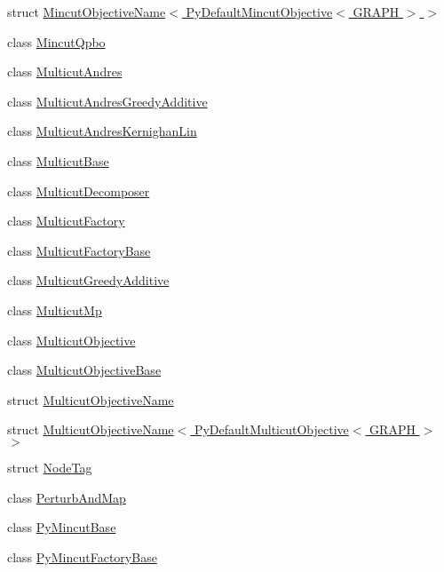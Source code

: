 \begin{DoxyCompactItemize}
struct \hyperlink{structnifty_1_1graph_1_1MincutObjectiveName_3_01PyDefaultMincutObjective_3_01GRAPH_01_4_01_4}{Mincut\+Objective\+Name$<$ Py\+Default\+Mincut\+Objective$<$ G\+R\+A\+P\+H $>$ $>$}
\item 
class \hyperlink{classnifty_1_1graph_1_1MincutQpbo}{Mincut\+Qpbo}
\item 
class \hyperlink{classnifty_1_1graph_1_1MulticutAndres}{Multicut\+Andres}
\item 
class \hyperlink{classnifty_1_1graph_1_1MulticutAndresGreedyAdditive}{Multicut\+Andres\+Greedy\+Additive}
\item 
class \hyperlink{classnifty_1_1graph_1_1MulticutAndresKernighanLin}{Multicut\+Andres\+Kernighan\+Lin}
\item 
class \hyperlink{classnifty_1_1graph_1_1MulticutBase}{Multicut\+Base}
\item 
class \hyperlink{classnifty_1_1graph_1_1MulticutDecomposer}{Multicut\+Decomposer}
\item 
class \hyperlink{classnifty_1_1graph_1_1MulticutFactory}{Multicut\+Factory}
\item 
class \hyperlink{classnifty_1_1graph_1_1MulticutFactoryBase}{Multicut\+Factory\+Base}
\item 
class \hyperlink{classnifty_1_1graph_1_1MulticutGreedyAdditive}{Multicut\+Greedy\+Additive}
\item 
class \hyperlink{classnifty_1_1graph_1_1MulticutMp}{Multicut\+Mp}
\item 
class \hyperlink{classnifty_1_1graph_1_1MulticutObjective}{Multicut\+Objective}
\item 
class \hyperlink{classnifty_1_1graph_1_1MulticutObjectiveBase}{Multicut\+Objective\+Base}
\item 
struct \hyperlink{structnifty_1_1graph_1_1MulticutObjectiveName}{Multicut\+Objective\+Name}
\item 
struct \hyperlink{structnifty_1_1graph_1_1MulticutObjectiveName_3_01PyDefaultMulticutObjective_3_01GRAPH_01_4_01_4}{Multicut\+Objective\+Name$<$ Py\+Default\+Multicut\+Objective$<$ G\+R\+A\+P\+H $>$ $>$}
\item 
struct \hyperlink{structnifty_1_1graph_1_1NodeTag}{Node\+Tag}
\item 
class \hyperlink{classnifty_1_1graph_1_1PerturbAndMap}{Perturb\+And\+Map}
\item 
class \hyperlink{classnifty_1_1graph_1_1PyMincutBase}{Py\+Mincut\+Base}
\item 
class \hyperlink{classnifty_1_1graph_1_1PyMincutFactoryBase}{Py\+Mincut\+Factory\+Base}

\end{DoxyCompactItemize}
